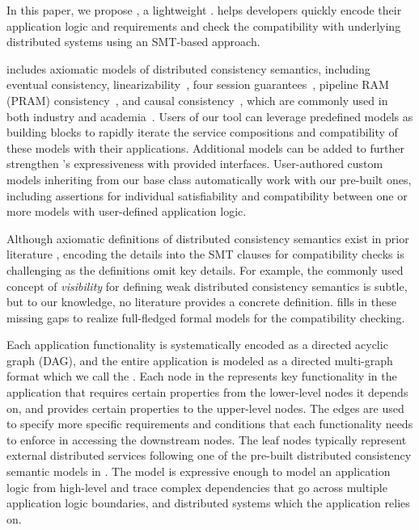 In this paper, we propose \sysname{}, a lightweight \sysnamelong{}. \sysname{}
helps developers quickly encode their application logic and
requirements and check the compatibility with underlying distributed
systems using an SMT-based approach.

\sysname{} includes axiomatic models of distributed consistency
semantics, including eventual consistency,
linearizability~\cite{viotti2016consistency}, four session
guarantees~\cite{terry1994session}, pipeline RAM (PRAM) consistency~\cite{pram},
and causal consistency~\cite{causaldef}, which are commonly used in both
industry and academia~\cite{pileus, cosmosdb, anna, bayou, yogurt,
pnuts, cloudflare-session, causalmemory, cops}.
Users of our tool can leverage predefined models as
building blocks to rapidly iterate the service compositions and compatibility
of these models with their applications. Additional models can be
added to further
strengthen \sysname{}'s expressiveness with provided interfaces.
User-authored custom models inheriting from our base class automatically work with our pre-built ones,
including assertions for individual satisfiability and compatibility between one or more models
with user-defined application logic.

Although axiomatic definitions of distributed consistency semantics
exist in prior literature \cite{finkbeiner2007smt,
  tekken2017monitoring, kuper2019toward, fan2023satisfiability,
ma2024noctua}, encoding the details into the SMT
clauses for compatibility checks is challenging as the definitions
omit key details. For example, the commonly used concept
of \textit{visibility} for defining weak distributed consistency
semantics is subtle, but to our knowledge, no literature provides
a concrete definition. \sysname{} fills in these missing gaps to realize
full-fledged formal models for the compatibility checking.

Each application functionality is systematically encoded as a
directed acyclic graph (DAG), and the entire application is modeled as
a directed multi-graph format which we call the \sysgraph{}.
Each node in the \sysgraph{} represents key functionality in the application
that requires certain properties from the lower-level nodes it depends on,
and provides certain properties to the upper-level nodes.
The edges are used to specify more specific requirements and conditions that each
functionality needs to enforce in accessing the downstream nodes.
The leaf nodes typically represent external distributed services
following one of the pre-built distributed consistency semantic models
in \sysname{}.
%
The \sysgraph{} model is expressive enough to model an application logic
from high-level and trace complex dependencies that go across multiple
application logic boundaries, and distributed systems which the application
relies on. 

